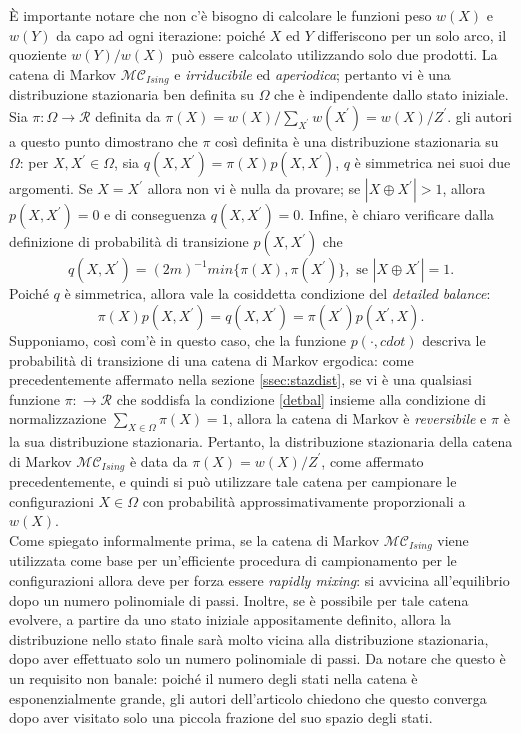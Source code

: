 È importante notare che non c'è bisogno di calcolare le funzioni peso $w(X)$ e $w(Y)$ da capo ad ogni iterazione: poiché $X$ ed $Y$ differiscono per un solo arco, il quoziente $w(Y)/w(X)$ può essere calcolato utilizzando solo due prodotti. La catena di Markov $\mathcal{MC}_{Ising}$ e \textit{irriducibile} ed \textit{aperiodica}; pertanto vi è una distribuzione stazionaria ben definita su $\Omega$ che è indipendente dallo stato iniziale. Sia $\pi : \Omega \rightarrow \mathcal{R}$ definita da $\pi(X) = w(X)/\sum_{X^\prime}{w(X^\prime)} = w(X)/Z^{\prime}$. gli autori a questo punto dimostrano che $\pi$ così definita è una distribuzione stazionaria su $\Omega$: per $X, X^\prime \in \Omega$, sia $q(X, X^\prime) = \pi(X)p(X, X^\prime)$, $q$ è simmetrica nei suoi due argomenti. Se $X = X^\prime$ allora non vi è nulla da provare; se $|X \oplus X^\prime| > 1$, allora $p(X, X^\prime) = 0$ e di conseguenza $q(X, X^\prime) = 0$. Infine, è chiaro verificare dalla definizione di probabilità di transizione $p(X, X^\prime)$ che
\begin{equation}
	q(X, X^\prime) = (2m)^{-1}min\lbrace \pi(X), \pi(X^\prime)\rbrace , \text{ se } |X \oplus X^\prime| = 1.
\end{equation}
Poiché $q$ è simmetrica, allora vale la cosiddetta condizione del \textit{detailed balance}:
\begin{equation}
	\pi(X)p(X, X^\prime) = q(X, X^\prime) = \pi(X^\prime)p(X^\prime, X).
	\label{detbal}
\end{equation}
Supponiamo, così com'è in questo caso, che la funzione $p(\cdot, cdot)$ descriva le probabilità di transizione di una catena di Markov ergodica: come precedentemente affermato nella sezione \ref{ssec:stazdist}, se vi è una qualsiasi funzione $\pi : \rightarrow \mathcal{R}$ che soddisfa la condizione \ref{detbal} insieme alla condizione di normalizzazione $\sum_{X\in\Omega}{\pi(X) = 1}$, allora la catena di Markov è \textit{reversibile} e $\pi$ è la sua distribuzione stazionaria. Pertanto, la distribuzione stazionaria della catena di Markov $\mathcal{MC}_{Ising}$ è data da $\pi(X) = w(X)/Z^\prime$, come affermato precedentemente, e quindi si può utilizzare tale catena per campionare le configurazioni $X \in \Omega$ con probabilità approssimativamente proporzionali a $w(X)$.\\
Come spiegato informalmente prima, se la catena di Markov $\mathcal{MC}_{Ising}$ viene utilizzata come base per un'efficiente procedura di campionamento per le configurazioni allora deve per forza essere \textit{rapidly mixing}: si avvicina all'equilibrio dopo un numero polinomiale di passi. Inoltre, se è possibile per tale catena evolvere, a partire da uno stato iniziale appositamente definito, allora la distribuzione nello stato finale sarà molto vicina alla distribuzione stazionaria, dopo aver effettuato solo un numero polinomiale di passi. Da notare che questo è un requisito non banale: poiché il numero degli stati nella catena è esponenzialmente grande, gli autori dell'articolo chiedono che questo converga dopo aver visitato solo una piccola frazione del suo spazio degli stati.\\
